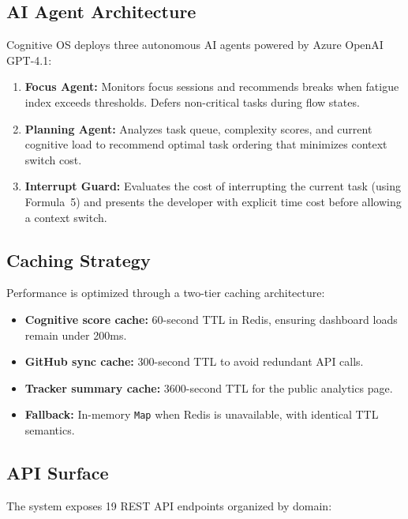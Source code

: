 \documentclass[12pt]{article}
\begin{document}
\subsection{AI Agent Architecture}

Cognitive OS deploys three autonomous AI agents powered by Azure OpenAI GPT-4.1:

\begin{enumerate}[noitemsep]
    \item \textbf{Focus Agent:} Monitors focus sessions and recommends breaks when fatigue index exceeds thresholds. Defers non-critical tasks during flow states.
    \item \textbf{Planning Agent:} Analyzes task queue, complexity scores, and current cognitive load to recommend optimal task ordering that minimizes context switch cost.
    \item \textbf{Interrupt Guard:} Evaluates the cost of interrupting the current task (using Formula~5) and presents the developer with explicit time cost before allowing a context switch.
\end{enumerate}

\subsection{Caching Strategy}

Performance is optimized through a two-tier caching architecture:

\begin{itemize}[noitemsep]
    \item \textbf{Cognitive score cache:} 60-second TTL in Redis, ensuring dashboard loads remain under 200ms.
    \item \textbf{GitHub sync cache:} 300-second TTL to avoid redundant API calls.
    \item \textbf{Tracker summary cache:} 3600-second TTL for the public analytics page.
    \item \textbf{Fallback:} In-memory \texttt{Map} when Redis is unavailable, with identical TTL semantics.
\end{itemize}

\subsection{API Surface}

The system exposes 19 REST API endpoints organized by domain:
\end{document}
